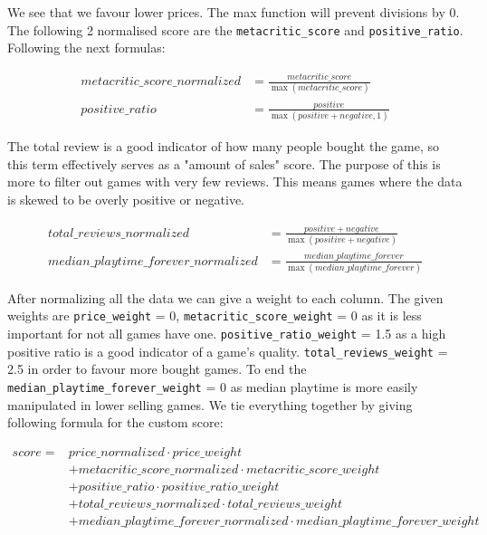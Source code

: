 \documentclass{article}
\begin{document}
	We see that we favour lower prices. The max function will prevent divisions by 0.\\
	The following 2 normalised score are the \texttt{metacritic\_score} and \texttt{positive\_ratio}. Following the next formulas:
	
	\begin{align}
		metacritic\_score\_normalized &= \frac{metacritic\_score}{\max{\left(metacritic\_score\right)}} \\
		positive\_ratio &= \frac{positive}{\max{\left(positive + negative, 1\right)}}
	\end{align}
	
	The total review is a good indicator of how many people bought the game, so this term effectively serves as a "amount of sales"  score. The purpose of this is more to filter out games with very few reviews. This means games where the data is skewed to be overly positive or negative.
	
	\begin{align}
		total\_reviews\_normalized &= \frac{positive + negative}{\max{\left(positive + negative\right)}}\\
		median\_playtime\_forever\_normalized &= \frac{median\_playtime\_forever}{\max{\left(median\_playtime\_forever\right)}}	
	\end{align}
		
	After normalizing all the data we can give a weight to each column. The given weights are \texttt{price\_weight} = 0, \texttt{metacritic\_score\_weight} = 0 as it is less important for not all games have one. \texttt{positive\_ratio\_weight} = 1.5 as a high positive ratio is a good indicator of a game's quality. \texttt{total\_reviews\_weight} = 2.5 in order to favour more bought games. To end the \texttt{median\_playtime\_forever\_weight} = 0 as median playtime is more easily manipulated in lower selling games. 
    We tie everything together by giving following formula for the custom score:
	
	\begin{align}
		score = &price\_normalized\cdot price\_weight\\
		 &+ metacritic\_score\_normalized\cdot metacritic\_score\_weight\\
		 &+ positive\_ratio\cdot positive\_ratio\_weight\\
		 &+ total\_reviews\_normalized\cdot total\_reviews\_weight\\
		 &+ median\_playtime\_forever\_normalized\cdot median\_playtime\_forever\_weight
	\end{align}
	
\end{document}
